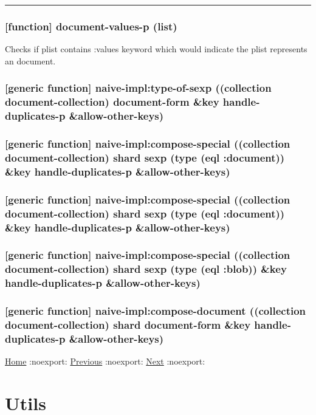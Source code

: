 \documentclass[11pt]{article}
\begin{document}
\noindent\rule{\textwidth}{0.5pt}

\subsubsection{[function] document-values-p (list)}
\label{sec:org1fa523f}

Checks if plist contains :values keyword which would indicate the
plist represents an document.

\subsubsection{[generic function] naive-impl:type-of-sexp ((collection document-collection) document-form \&key handle-duplicates-p \&allow-other-keys)}
\label{sec:org9da181a}

\subsubsection{[generic function] naive-impl:compose-special ((collection document-collection) shard sexp (type (eql :document)) \&key handle-duplicates-p \&allow-other-keys)}
\label{sec:org7870da7}

\subsubsection{[generic function] naive-impl:compose-special ((collection document-collection) shard sexp (type (eql :document)) \&key handle-duplicates-p \&allow-other-keys)}
\label{sec:orgeb7f530}

\subsubsection{[generic function] naive-impl:compose-special ((collection document-collection) shard sexp (type (eql :blob)) \&key handle-duplicates-p \&allow-other-keys)}
\label{sec:orgac8200a}

\subsubsection{[generic function] naive-impl:compose-document ((collection document-collection) shard document-form \&key handle-duplicates-p \&allow-other-keys)}
\label{sec:org66c1361}

\href{home.org}{Home} :noexport: \href{user-api.org}{Previous} :noexport: \href{utils.org}{Next} :noexport:
\section{Utils}
\label{sec:org4cc2be9}
\end{document}
